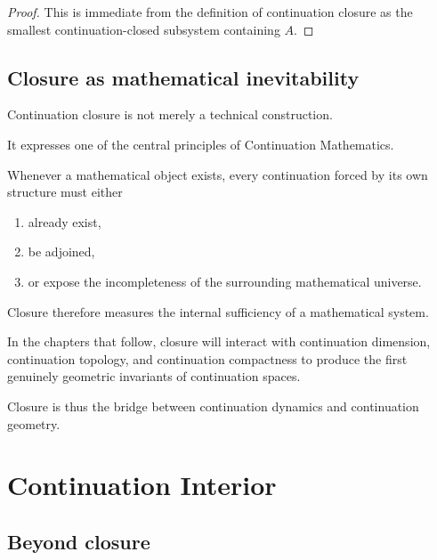 \documentclass[13pt,openany]{book}
\theoremstyle{plain}
\theoremstyle{definition}
\begin{document}
\begin{proof}

This is immediate from the definition of continuation closure as the smallest
continuation-closed subsystem containing \(A\).

\end{proof}


\section{Closure as mathematical inevitability}

Continuation closure is not merely a technical construction.

It expresses one of the central principles of Continuation Mathematics.

Whenever a mathematical object exists, every continuation forced by its own
structure must either

\begin{enumerate}

\item
already exist,

\item
be adjoined,

\item
or expose the incompleteness of the surrounding mathematical universe.

\end{enumerate}

Closure therefore measures the internal sufficiency of a mathematical system.

In the chapters that follow, closure will interact with continuation
dimension, continuation topology, and continuation compactness to produce the
first genuinely geometric invariants of continuation spaces.

Closure is thus the bridge between continuation dynamics and continuation
geometry.

\chapter{Continuation Interior}

\section{Beyond closure}
\end{document}
